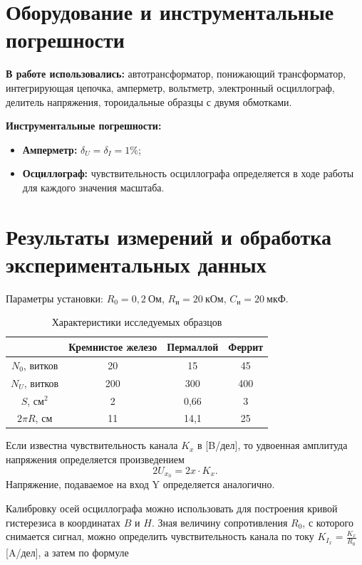 \documentclass[a4paper, 12pt]{article}
\begin{document}
\section{Оборудование и инструментальные погрешности}

\textbf{В работе использовались:} автотрансформатор, понижающий трансформатор, интегрирующая цепочка, амперметр, вольтметр, электронный осциллограф, делитель напряжения, тороидальные образцы с двумя обмотками.

\textbf{Инструментальные погрешности:}
\begin{itemize}
    \item \textbf{Амперметр:} $\delta_U = \delta_I = 1\%$;
    \item \textbf{Осциллограф:} чувствительность осциллографа определяется в ходе работы для каждого значения масштаба.
\end{itemize}

\section{Результаты измерений и обработка экспериментальных данных}

Параметры установки: $R_0 = 0,2~Ом$, $R_и = 20~кОм$, $C_и = 20~мкФ$.

\begin{table}[h!]
\begin{center}
\begin{tabular}{|c|c|c|c|}
\hline 
 & Кремнистое железо & Пермаллой & Феррит \\ 
\hline 
$N_0$, витков & 20 & 15 & 45 \\ 
\hline 
$N_U$, витков & 200 & 300 & 400 \\ 
\hline 
$S$, $см^2$ & 2 & 0,66 & 3 \\ 
\hline 
$2\pi R$, $см$ & 11 & 14,1 & 25 \\ 
\hline 
\end{tabular} 
\end{center}
\caption{Характеристики исследуемых образцов}
\label{tab1}
\end{table}

Если известна чувствительность канала $K_x$ в [B/дел], то удвоенная амплитуда напряжения определяется произведением $$2U_{x_0} = 2x \cdot K_x.$$ Напряжение, подаваемое на вход Y определяется аналогично.

Калибровку осей осциллографа можно использовать для построения кривой гистерезиса в координатах $B$ и $H$. Зная величину сопротивления $R_0$, с которого снимается сигнал, можно определить чувствительность канала по току $K_{I_x} = \frac{K_x}{R_0}$ [A/дел], а затем по формуле
\end{document}
